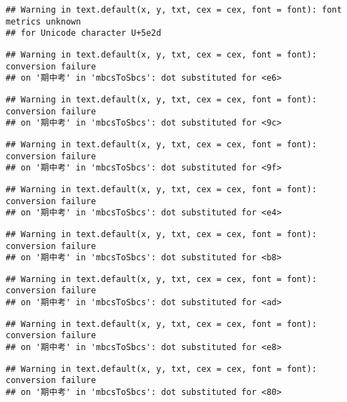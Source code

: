 \documentclass[
]{book}
\begin{document}
\begin{verbatim}
## Warning in text.default(x, y, txt, cex = cex, font = font): font metrics unknown
## for Unicode character U+5e2d
\end{verbatim}

\begin{verbatim}
## Warning in text.default(x, y, txt, cex = cex, font = font): conversion failure
## on '期中考' in 'mbcsToSbcs': dot substituted for <e6>
\end{verbatim}

\begin{verbatim}
## Warning in text.default(x, y, txt, cex = cex, font = font): conversion failure
## on '期中考' in 'mbcsToSbcs': dot substituted for <9c>
\end{verbatim}

\begin{verbatim}
## Warning in text.default(x, y, txt, cex = cex, font = font): conversion failure
## on '期中考' in 'mbcsToSbcs': dot substituted for <9f>
\end{verbatim}

\begin{verbatim}
## Warning in text.default(x, y, txt, cex = cex, font = font): conversion failure
## on '期中考' in 'mbcsToSbcs': dot substituted for <e4>
\end{verbatim}

\begin{verbatim}
## Warning in text.default(x, y, txt, cex = cex, font = font): conversion failure
## on '期中考' in 'mbcsToSbcs': dot substituted for <b8>
\end{verbatim}

\begin{verbatim}
## Warning in text.default(x, y, txt, cex = cex, font = font): conversion failure
## on '期中考' in 'mbcsToSbcs': dot substituted for <ad>
\end{verbatim}

\begin{verbatim}
## Warning in text.default(x, y, txt, cex = cex, font = font): conversion failure
## on '期中考' in 'mbcsToSbcs': dot substituted for <e8>
\end{verbatim}

\begin{verbatim}
## Warning in text.default(x, y, txt, cex = cex, font = font): conversion failure
## on '期中考' in 'mbcsToSbcs': dot substituted for <80>
\end{verbatim}
\end{document}
